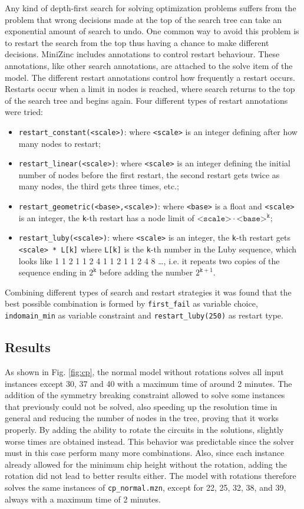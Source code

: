 \documentclass[a4paper, 12pt]{article}
\begin{document}
Any kind of depth-first search for solving optimization problems suffers from the problem that wrong decisions made at the top of the search tree can take an exponential amount of search to undo. One common way to avoid this problem is to restart the search from the top thus having a chance to make different decisions. MiniZinc includes annotations to control restart behaviour. These annotations, like other search annotations, are attached to the solve item of the model. The different restart annotations control how frequently a restart occurs. Restarts occur when a limit in nodes is reached, where search returns to the top of the search tree and begins again. Four different types of restart annotations were tried:
\begin{itemize}
	\item \verb|restart_constant(<scale>)|: where \verb|<scale>| is an integer defining after how many nodes to restart;
	\item \verb|restart_linear(<scale>)|: where \verb|<scale>| is an integer defining the initial number of nodes before the first restart, the second restart gets twice as many nodes, the third gets three times, etc.;
	\item \verb|restart_geometric(<base>,<scale>)|: where \verb|<base>| is a float and \verb|<scale>| is an integer, the \verb|k|-th restart has a node limit of $\texttt{<scale>} \cdot \texttt{<base>}^\texttt{k}$;
	\item \verb|restart_luby(<scale>)|: where \verb|<scale>| is an integer, the \verb|k|-th restart gets \verb|<scale> * L[k]| where \verb|L[k]| is the \verb|k|-th number in the Luby sequence, which looks like 1 1 2 1 1 2 4 1 1 2 1 1 2 4 8 …, i.e. it repeats two copies of the sequence ending in $2^\texttt{k}$ before adding the number $2^{\texttt{k}+1}$.
\end{itemize}
Combining different types of search and restart strategies it was found that the best possible combination is formed by \verb|first_fail| as variable choice, \verb|indomain_min| as variable constraint and \verb|restart_luby(250)| as restart type.

\subsection{Results}
As shown in Fig. \ref{fig:cp}, the normal model without rotations solves all input instances except 30, 37 and 40 with a maximum time of around 2 minutes. The addition of the symmetry breaking constraint allowed to solve some instances that previously could not be solved, also speeding up the resolution time in general and reducing the number of nodes in the tree, proving that it works properly. By adding the ability to rotate the circuits in the solutions, slightly worse times are obtained instead. This behavior was predictable since the solver must in this case perform many more combinations. Also, since each instance already allowed for the minimum chip height without the rotation, adding the rotation did not lead to better results either. The model with rotations therefore solves the same instances of \verb|cp_normal.mzn|, except for 22, 25, 32, 38, and 39, always with a maximum time of 2 minutes.
\end{document}
